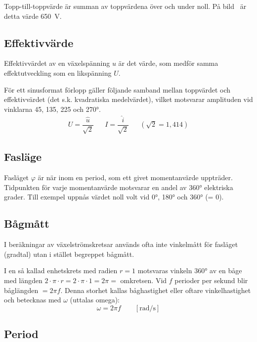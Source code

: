 Topp-till-toppvärde är summan av toppvärdena över och under noll.
På bild~ är detta värde \qty{650}{\volt}.

\subsection{Effektivvärde}
\label{subsec:effektivvaerde}

Effektivvärdet av en växelspänning \(u\) är det värde, som medför samma
effektutveckling som en likspänning \(U\).

För ett sinusformat förlopp gäller följande samband mellan toppvärdet och
effektivvärdet (det s.k. kvadratiska medelvärdet), vilket motsvarar amplituden
vid vinklarna 45, 135, 225 och \ang{270}.
\[
\begin{array}{lllll}
U=\dfrac{\hat{u}}{\sqrt{2}} & & I=\dfrac{\hat{i}}{\sqrt{2}} & & (\sqrt{2} = 1,414)
\end{array}
\]
\subsection{Fasläge}

Fasläget \(\varphi\) är när inom en period, som ett givet momentanvärde
uppträder.
Tidpunkten för varje momentanvärde motsvarar en andel av \ang{360} elektriska
grader.
Till exempel uppnås värdet noll volt vid \ang{0}, \ang{180} och \ang{360} (= 0\degree).

\subsection{Bågmått}

I beräkningar av växelströmskretsar används ofta inte vinkelmått för fasläget
(gradtal) utan i stället begreppet bågmått.

I en så kallad enhetskrets med radien \(r = 1\) motsvaras vinkeln \ang{360} av
en båge med längden \(2 \cdot \pi \cdot r= 2 \cdot \pi \cdot 1 = 2 \pi =\)
omkretsen.
Vid \(f\) perioder per sekund blir båglängden \(= 2\pi f\).
Denna storhet kallas båghastighet eller oftare vinkelhastighet och betecknas
med \(\omega\) (uttalas omega):
\[\omega= 2\pi f\qquad [\text{rad/s}]\]
\subsection{Period}
\label{period}

